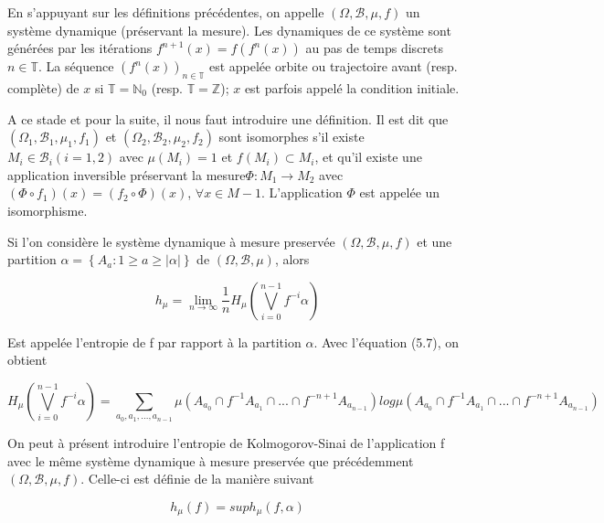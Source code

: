 \vspace{2ex}
En s'appuyant sur les définitions précédentes, on appelle $(\Omega, \mathcal{B}, \mu, f)$ un système dynamique (préservant la mesure). Les dynamiques de ce système sont générées par les itérations $f^{n+1}(x) = f(f^n(x))$ au pas de temps discrets $n \in \mathbb{T}$. La séquence $(f^n(x))_{n \in \mathbb{T}}$ est appelée orbite ou trajectoire avant (resp. complète) de $x$ si $\mathbb{T} = \mathbb{N}_0$ (resp. $\mathbb{T} = \mathbb{Z}$); $x$ est parfois appelé la condition initiale.

\vspace{2ex}
A ce stade et pour la suite, il nous faut introduire une définition. Il est dit que $(\Omega_1,\mathcal{B}_1,\mu_1,f_1)$ et $(\Omega_2,\mathcal{B}_2,\mu_2,f_2)$ sont isomorphes s'il existe $M_i \in \mathcal{B}_i (i=1,2)$ avec $\mu(M_i)=1$ et $f(M_i) \subset M_i$, et qu'il existe une application inversible préservant la mesure$\Phi: M_1 \longrightarrow M_2$ avec $(\Phi \circ f_1)(x)=(f_2 \circ \Phi)(x)$, $\forall x \in M-1$. L'application $\Phi$ est appelée un isomorphisme.

\vspace{2ex}
Si l'on considère le système dynamique à mesure preservée $(\Omega,\mathcal{B},\mu,f)$ et une partition $\alpha = \left\{A_a : 1 \geq a \geq |\alpha|\right\}$ de $(\Omega,\mathcal{B},\mu)$, alors  

\begin{equation}
    h_{\mu} = \lim_{n \to \infty} \frac{1}{n} H_{\mu}(\bigvee_{i=0}^{n-1} f^{-i}\alpha)
\end{equation}

Est appelée l'entropie de f par rapport à la partition $\alpha$. Avec l'équation (5.7), on obtient

\begin{equation}
    H_{\mu}(\bigvee_{i=0}^{n-1} f^{-i}\alpha) = \sum_{a_0,a_1,...,a_{n-1}} \mu(A_{a_0} \cap f^{-1}A_{a_1} \cap...\cap f^{-n+1}A_{a_{n-1}})log\mu(A_{a_0} \cap f^{-1}A_{a_1} \cap...\cap f^{-n+1}A_{a_{n-1}})
\end{equation}

On peut à présent introduire l'entropie de Kolmogorov-Sinai de l'application f avec le même système dynamique à mesure preservée que précédemment $(\Omega,\mathcal{B},\mu, f)$. Celle-ci est définie de la manière suivant

\begin{equation}
    h_{\mu}(f) = sup h_{\mu}(f,\alpha)
\end{equation}

